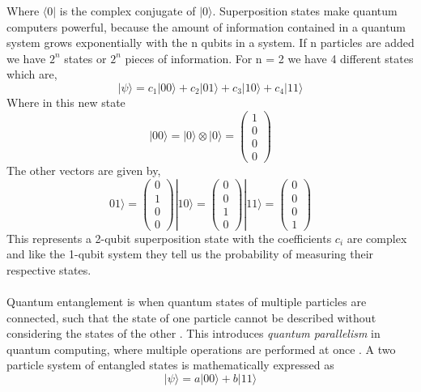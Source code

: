 \documentclass{Assignment}
\begin{document}
Where $\langle 0|$ is the complex conjugate of $|0\rangle$.
Superposition states make quantum computers powerful, because the amount of information contained in a quantum system grows exponentially with the n qubits in a system.
If n particles are added we have $2^n$ states or $2^n$ pieces of information. 
For n = 2 we have 4 different states which are,
\begin{equation}
	|\psi\rangle =c_1 |00\rangle+c_2 |01\rangle+c_3 |10\rangle+ c_4 |11\rangle
\end{equation}
Where in this new state \begin{equation}|00\rangle = |0\rangle\otimes|0\rangle  =	\begin{pmatrix}
		1\\0\\0\\0
\end{pmatrix}\end{equation}
The other vectors are given by,
$$01\rangle =	\begin{pmatrix}
	0\\1\\0\\0
\end{pmatrix}|10\rangle =	\begin{pmatrix}
	0\\0\\1\\0
\end{pmatrix}|11\rangle =	\begin{pmatrix}
	0\\0\\0\\1
\end{pmatrix} $$
This represents a 2-qubit superposition state with the coefficients $c_i$ are complex and like the 1-qubit system they tell us the probability of measuring their respective states.
\\\\
Quantum entanglement is when quantum states of multiple particles are connected, such that the state of one particle cannot be described without considering the states of the other \cite{Horodecki_2009}.
This introduces \textit{quantum parallelism} in quantum computing, where multiple operations are performed at once \cite{mcintyre_quantum_2012}.
A two particle system of entangled states is mathematically expressed as
 \begin{equation}
 	|\psi \rangle = a|00\rangle + b|11\rangle
 	\label{entagled_state}
 	\end{equation}
\end{document}

